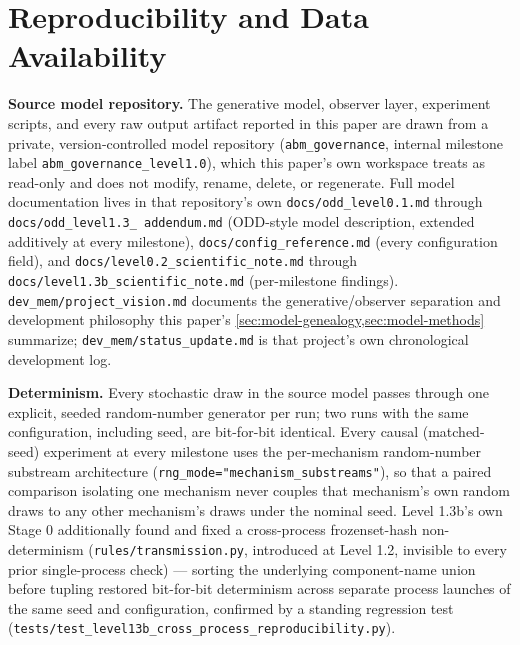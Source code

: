 \section{Reproducibility and Data Availability}
\label{sec:reproducibility}

\textbf{Source model repository.} The generative model, observer layer,
experiment scripts, and every raw output artifact reported in this paper
are drawn from a private, version-controlled model repository
(\texttt{abm\_governance}, internal milestone label
\texttt{abm\_governance\_level1.0}), which this paper's own workspace
treats as read-only and does not modify, rename, delete, or regenerate.
Full model documentation lives in that repository's own
\texttt{docs/odd\_level0.1.md} through \texttt{docs/odd\_level1.3\_%
addendum.md} (ODD-style model description, extended additively at every
milestone), \texttt{docs/config\_reference.md} (every configuration
field), and \texttt{docs/level0.2\_scientific\_note.md} through
\texttt{docs/level1.3b\_scientific\_note.md} (per-milestone findings).
\texttt{dev\_mem/project\_vision.md} documents the generative/observer
separation and development philosophy this paper's
\cref{sec:model-genealogy,sec:model-methods} summarize;
\texttt{dev\_mem/status\_update.md} is that project's own chronological
development log.

\textbf{Determinism.} Every stochastic draw in the source model passes
through one explicit, seeded random-number generator per run; two runs
with the same configuration, including seed, are bit-for-bit identical.
Every causal (matched-seed) experiment at every milestone uses the
per-mechanism random-number substream architecture
(\texttt{rng\_mode="mechanism\_substreams"}), so that a paired comparison
isolating one mechanism never couples that mechanism's own random draws to
any other mechanism's draws under the nominal seed. Level 1.3b's own Stage
0 additionally found and fixed a cross-process frozenset-hash
non-determinism (\texttt{rules/transmission.py}, introduced at Level 1.2,
invisible to every prior single-process check) --- sorting the underlying
component-name union before tupling restored bit-for-bit determinism
across separate process launches of the same seed and configuration,
confirmed by a standing regression test
(\texttt{tests/test\_level13b\_cross\_process\_reproducibility.py}).

